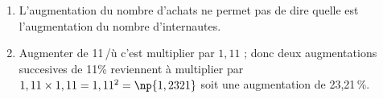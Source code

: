 
\medskip

% 
%

\begin{enumerate}
\item %
L'augmentation du nombre d'achats ne permet pas de dire quelle est l'augmentation du nombre d'internautes. 
\item %
Augmenter de 11\,/ù c'est multiplier par $1,11$ ; donc deux augmentations succesives de 11\;\% reviennent à multiplier par $1,11 \times 1,11 = 1,11^2 = \np{1,2321}$ soit une augmentation de 23,21\,\%.
\end{enumerate}
 
\bigskip

